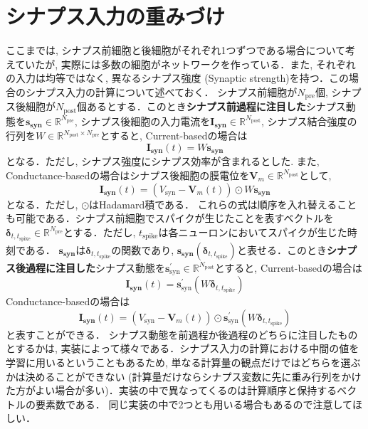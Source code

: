 \section{シナプス入力の重みづけ
}
ここまでは, シナプス前細胞と後細胞がそれぞれ1つずつである場合について考えていたが, 実際には多数の細胞がネットワークを作っている．また, それぞれの入力は均等ではなく, 異なるシナプス強度 (Synaptic strength)を持つ．この場合のシナプス入力の計算について述べておく．
シナプス前細胞が$N_{\text{pre}}$個, シナプス後細胞が$N_{\text{post}}$個あるとする．このとき\textbf{シナプス前過程に注目した}シナプス動態を$\boldsymbol{s_{\text{syn}}}\in \mathbb{R}^{N_{\text{pre}}}$, シナプス後細胞の入力電流を$\boldsymbol{I_{\text{syn}}}\in \mathbb{R}^{N_{\text{post}}}$, シナプス結合強度の行列を$W\in \mathbb{R}^{N_{\text{post}} \times N_{\text{pre}}}$とすると, Current-basedの場合は
\begin{equation}
\boldsymbol{I_{\text{syn}}}(t)=W \boldsymbol{s_{\text{syn}}}  
\end{equation}
となる．ただし, シナプス強度にシナプス効率が含まれるとした. また, Conductance-basedの場合はシナプス後細胞の膜電位を$\boldsymbol{V}_{m}\in \mathbb{R}^{N_{\text{post}}}$として, 
\begin{equation}
\boldsymbol{I_{\text{syn}}}(t)=\left(V_{\text{syn}}-\boldsymbol{V}_{m}(t)\right)\odot W \boldsymbol{s_{\text{syn}}}
\end{equation}
となる．ただし, $\odot$はHadamard積である．
これらの式は順序を入れ替えることも可能である．シナプス前細胞でスパイクが生じたことを表すベクトルを$\boldsymbol{\delta}_{t,t_{\text{spike}}}\in \mathbb{R}^{N_{\text{pre}}}$とする．ただし, $t_{\text{spike}}$は各ニューロンにおいてスパイクが生じた時刻である． $\boldsymbol{s_{\text{syn}}}$は$\boldsymbol{\delta}_{t,t_{\text{spike}}}$の関数であり, $\boldsymbol{s_{\text{syn}}}(\boldsymbol{\delta}_{t,t_{\text{spike}}})$と表せる．このとき\textbf{シナプス後過程に注目した}シナプス動態を$\boldsymbol{s}^\prime_{\text{syn}}\in \mathbb{R}^{N_{\text{post}}}$とすると, Current-basedの場合は
\begin{equation}
\boldsymbol{I_{\text{syn}}}(t)=\boldsymbol{s}^\prime_{\text{syn}}(W\boldsymbol{\delta}_{t,t_{\text{spike}}})  
\end{equation}
Conductance-basedの場合は
\begin{equation}
\boldsymbol{I_{\text{syn}}}(t)=\left(V_{\text{syn}}-\boldsymbol{V}_{m}(t)\right)\odot \boldsymbol{s}^\prime_{\text{syn}}(W\boldsymbol{\delta}_{t,t_{\text{spike}}})
\end{equation}
と表すことができる．
シナプス動態を前過程か後過程のどちらに注目したものとするかは, 実装によって様々である．シナプス入力の計算における中間の値を学習に用いるということもあるため, 単なる計算量の観点だけではどちらを選ぶかは決めることができない (計算量だけならシナプス変数に先に重み行列をかけた方がよい場合が多い)．実装の中で異なってくるのは計算順序と保持するベクトルの要素数である． 同じ実装の中で2つとも用いる場合もあるので注意してほしい．
